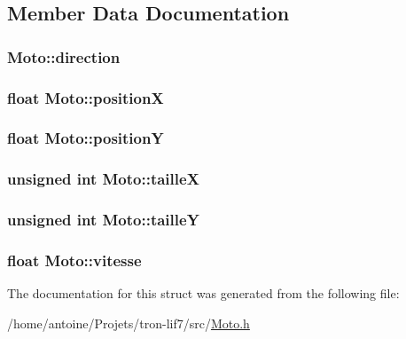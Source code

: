 \subsection{Member Data Documentation}
\hypertarget{structMoto_ace42f991dc2d223029ca7f7162a10e9b}{
\subsubsection[{direction}]{ Moto\-::direction}}\label{structMoto_ace42f991dc2d223029ca7f7162a10e9b}
\hypertarget{structMoto_a7d9695eb69a7161d1a6800e4b8bc4170}{
\subsubsection[{position\-X}]{\setlength{\rightskip}{0pt plus 5cm}float Moto\-::position\-X}}\label{structMoto_a7d9695eb69a7161d1a6800e4b8bc4170}
\hypertarget{structMoto_a68859bbff76786aedccab8093a9de5a8}{
\subsubsection[{position\-Y}]{\setlength{\rightskip}{0pt plus 5cm}float Moto\-::position\-Y}}\label{structMoto_a68859bbff76786aedccab8093a9de5a8}
\hypertarget{structMoto_a15d1b56209aba6ea0bc8eeaac82ae625}{
\subsubsection[{taille\-X}]{\setlength{\rightskip}{0pt plus 5cm}unsigned int Moto\-::taille\-X}}\label{structMoto_a15d1b56209aba6ea0bc8eeaac82ae625}
\hypertarget{structMoto_ab7b358839b7d20f16a4a17e5eabad5a4}{
\subsubsection[{taille\-Y}]{\setlength{\rightskip}{0pt plus 5cm}unsigned int Moto\-::taille\-Y}}\label{structMoto_ab7b358839b7d20f16a4a17e5eabad5a4}
\hypertarget{structMoto_a561dfc3e54a534dfa92ccecbea8dbe71}{
\subsubsection[{vitesse}]{\setlength{\rightskip}{0pt plus 5cm}float Moto\-::vitesse}}\label{structMoto_a561dfc3e54a534dfa92ccecbea8dbe71}


The documentation for this struct was generated from the following file\-:\begin{DoxyCompactItemize}
\item 
/home/antoine/\-Projets/tron-\/lif7/src/\hyperlink{Moto_8h}{Moto.\-h}\end{DoxyCompactItemize}
